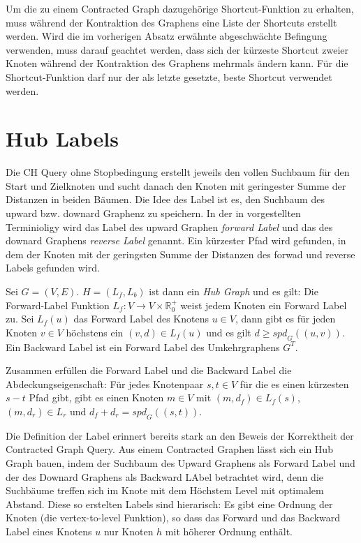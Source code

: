 Um die zu einem Contracted Graph dazugehörige Shortcut-Funktion zu erhalten, muss während der Kontraktion des Graphens eine Liste der Shortcuts erstellt werden.
Wird die im vorherigen Absatz erwähnte abgeschwächte Befingung verwenden, muss darauf geachtet werden, dass sich der kürzeste Shortcut zweier Knoten während der Kontraktion des Graphens mehrmals ändern kann.
Für die Shortcut-Funktion darf nur der als letzte gesetzte, beste Shortcut verwendet werden.

\section{Hub Labels}\label{chapter:hl}

Die CH Query ohne Stopbedingung erstellt jeweils den vollen Suchbaum für den Start und Zielknoten und sucht danach den Knoten mit geringester Summe der Distanzen in beiden Bäumen.
Die Idee des Label ist es, den Suchbaum des upward bzw. downard Graphenz zu speichern.
In der in \cite{abraham2011hub} vorgestellten Terminioligy wird das Label des upward Graphen \emph{forward Label} und das des downard Graphens \emph{reverse Label} genannt.
Ein kürzester Pfad wird gefunden, in dem der Knoten mit der geringsten Summe der Distanzen des forwad und reverse Labels gefunden wird.

\begin{definition}
    Sei $G = (V, E)$. $H = (L_f, L_b)$ ist dann ein \emph{Hub Graph} und es gilt:
    Die Forward-Label Funktion $L_f \colon V \to V \times \mathbb{R}^+_0$ weist jedem Knoten ein Forward Label zu.
    Sei $L_f (u)$ das Forward Label des Knotens $u \in V$, dann gibt es für jeden Knoten $v \in V$ höchstens ein $(v, d) \in L_f (u)$ und es gilt $d \geq {spd}_G((u, v))$.
    Ein Backward Label ist ein Forward Label des Umkehrgraphens $G^T$.

    Zusammen erfüllen die Forward Label und die Backward Label die Abdeckungseigenschaft:
    Für jedes Knotenpaar $s, t \in V$ für die es einen kürzesten $s-t$ Pfad gibt, gibt es einen Knoten $m \in V$ mit $(m, d_f) \in L_f (s)$, $(m, d_r) \in L_r$ und $d_f + d_r = {spd}_G ((s, t))$.
\end{definition}

Die Definition der Label erinnert bereits stark an den Beweis der Korrektheit der Contracted Graph Query.
Aus einem Contracted Graphen lässt sich ein Hub Graph bauen, indem der Suchbaum des Upward Graphens als Forward Label und der des Downard Graphens als Backward LAbel betrachtet wird, denn die Suchbäume treffen sich im Knote mit dem Höchstem Level mit optimalem Abstand.
Diese so erstelten Labels sind hierarisch: Es gibt eine Ordnung der Knoten (die vertex-to-level Funktion), so dass das Forward und das Backward Label eines Knotens $u$ nur Knoten $h$ mit höherer Ordnung enthält.


